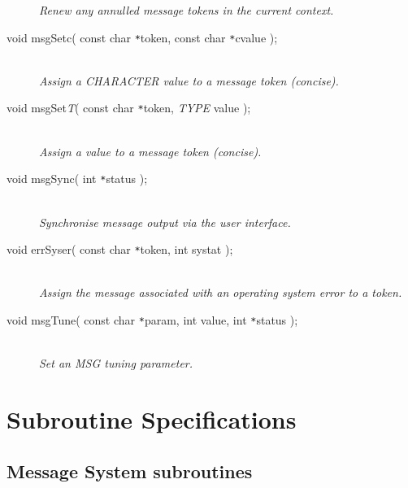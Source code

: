 \documentclass[twoside,11pt]{article}
\newcommand{\xlabel}[1]{}
\renewcommand{\_}{\texttt{\symbol{95}}}
\newcommand{\listline}{\hspace{1pt}\\}
\newcommand{\listline}{}
\begin{document}
\begin{description}
\textit{Renew any annulled message tokens in the current context.}
\item[void msgSetc( const char \texttt{*}token, 
const char \texttt{*}cvalue );] \listline
\textit{Assign a CHARACTER value to a message token (concise).}
\item[void msgSet\textit{T}( const char \texttt{*}token, 
\textit{TYPE} value );] \listline
\textit{Assign a value to a message token (concise).}
\item[void msgSync( int \texttt{*}status );] \listline
\textit{Synchronise message output via the user interface.}
\item[void errSyser( const char \texttt{*}token, int systat );] \listline
\textit{Assign the message associated with an operating system error to a
token.}
\item[void msgTune( const char \texttt{*}param, int value, 
int \texttt{*}status );] \listline
\textit{Set an MSG tuning parameter.}
\end{description}

\newpage
\section{\xlabel{subroutine_specifications}Subroutine Specifications \label{specs_sect}}
\subsection{\xlabel{message_system_subroutines}Message System subroutines}
\end{document}
